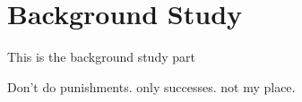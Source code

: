
\chapter{Background Study}
\label{chap:litReview}
This is the background study part


Don't do punishments. only successes. not my place.